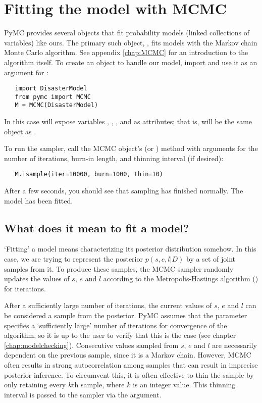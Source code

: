 \section{Fitting the model with MCMC}

PyMC provides several objects that fit probability models (linked collections of variables) like ours. The primary such object, , fits models with the Markov chain Monte Carlo algorithm. See appendix \ref{chap:MCMC} for an introduction to the algorithm itself. To create an  object to handle our model, import  and use it as an argument for :
\begin{verbatim}
   import DisasterModel
   from pymc import MCMC
   M = MCMC(DisasterModel)
\end{verbatim}
In this case  will expose variables , , ,  and  as attributes; that is,  will be the same object as .     

To run the sampler, call the MCMC object's  (or ) method with arguments for the number of iterations, burn-in length, and thinning interval (if desired): 
\begin{verbatim}
   M.isample(iter=10000, burn=1000, thin=10)
\end{verbatim}
After a few seconds, you should see that sampling has finished normally. The model has been fitted.

\subsection{What does it mean to fit a model?}

`Fitting' a model means characterizing its posterior distribution somehow. In this case, we are trying to represent the posterior $p(s,e,l|D)$ by a set of joint samples from it. To produce these samples, the MCMC sampler randomly updates the values of $s$, $e$ and $l$ according to the Metropolis-Hastings algorithm (\cite{gelman}) for   iterations. 

After a sufficiently large number of iterations, the current values of $s$, $e$ and $l$ can be considered a sample from the posterior. PyMC assumes that the  parameter specifies a `sufficiently large' number of iterations for convergence of the algorithm, so it is up to the user to verify that this is the case (see chapter \ref{chap:modelchecking}). Consecutive values sampled from $s$, $e$ and $l$ are necessarily dependent on the previous sample, since it is a Markov chain. However, MCMC often results in strong autocorrelation among samples that can result in imprecise posterior inference. To circumvent this, it is often effective to thin the sample by only retaining every $k$th sample, where $k$ is an integer value. This thinning interval is passed to the sampler via the  argument. 

